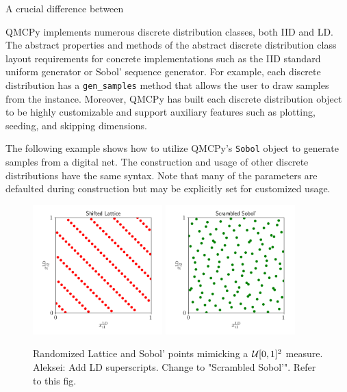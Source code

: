 \documentclass[graybox,footinfo]{svmult}
\newcommand{\AGSComment}[1]{{\color{cyan} Aleksei: #1}}
\begin{document}
A crucial difference between 




QMCPy implements numerous discrete distribution classes, both IID and LD. The abstract properties and methods of the abstract discrete distribution class layout requirements for concrete implementations such as the IID standard uniform generator or Sobol' sequence generator. For example, each discrete distribution has a \texttt{gen\_samples} method that allows the user to draw samples from the instance. Moreover, QMCPy has built each discrete distribution object to be highly customizable and support auxiliary features such as plotting, seeding, and skipping dimensions. 

The following example shows how to utilize QMCPy's \texttt{Sobol} object to generate samples from a digital net. The construction and usage of other discrete distributions have the same syntax. Note that many of the parameters are defaulted during construction but may be explicitly set for customized usage. 



\begin{figure}
	\includegraphics[height=5cm]{ags/figs/dd.lattice.png}
	\qquad
	\includegraphics[height=5cm]{ags/figs/dd.sobol.png}
	\caption{Randomized Lattice and Sobol' points mimicking a ${\mathcal{U}}[0,1]^2$ measure. \AGSComment{Add LD superscripts. Change to "Scrambled Sobol'". Refer to this fig.}}
	\label{fig:dd_iid}
\end{figure}
\end{document}
